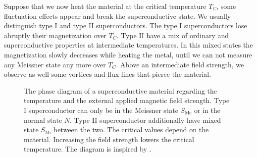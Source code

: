 \documentclass[../main.tex]{subfile}
\begin{document}
Suppose that we now heat the material at the critical temperature $T_C$, some fluctuation effects appear and break the superconductive state.
We usually distinguish type I and type II superconductors. The type I superconductors
lose abruptly their magnetization over $T_C$. Type II have a mix of ordinary and superconductive properties at intermediate temperatures.
 In this mixed states the magnetization slowly decreases while heating the metal,
 until we can not measure any Meissner state any more over $T_C$. Above an intermediate field strength, we observe as well some vortices
  and flux lines that pierce the material.\\
 \begin{figure}[H]\centering

    
        \caption{The phase diagram of a superconductive material regarding the temperature and the external applied magnetic field strength. Type I superconductor can only be in 
        the Meissner state $S_{\text{Me}}$ or in the normal state $N$. Type II superconductor additionally have mixed state $S_{\text{Mi}}$ between the two. The critical values depend on the material.
        Increasing the field strength lowers the critical temperature. The diagram is inspired by \cite{FossheimSudbo2004}.}
    \end{figure}
 
\end{document}
